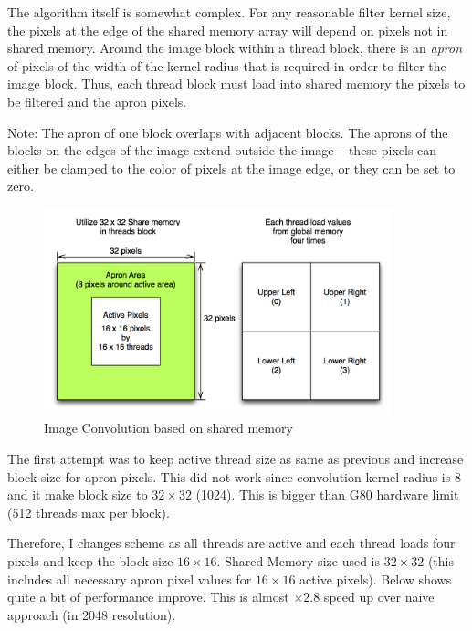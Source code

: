 The algorithm itself is somewhat complex. For any reasonable filter kernel size, the
pixels at the edge of the shared memory array will depend on pixels not in shared memory.
Around the image block within a thread block, there is an \textit{apron} of pixels of the width of the
kernel radius that is required in order to filter the image block. Thus, each thread block
must load into shared memory the pixels to be filtered and the apron pixels.

Note: The apron of one block overlaps with adjacent blocks. The aprons of the
blocks on the edges of the image extend outside the image – these pixels can either be
clamped to the color of pixels at the image edge, or they can be set to zero.

\begin{figure}[!hbtp]
\centering
\includegraphics[width=0.9\textwidth]{CUDAImageProcessing/ImageConvoOnShare1}
\caption{Image Convolution based on shared memory}
\label{fig3.2}
\end{figure}

The first attempt was to keep active thread size as same as previous and increase block size for apron pixels. This did not work since convolution kernel radius is 8 and it make block size to $32 \times 32$ (1024). This is bigger than G80 hardware limit (512 threads max per block).

Therefore, I changes scheme as all threads are active and each thread loads four pixels and keep the block size $16 \times 16$. Shared Memory size used is $32 \times 32$ (this includes all necessary apron pixel values for $16 \times 16$ active pixels). Below shows quite a bit of performance improve. This is almost $\times2.8$ speed up over naive approach (in 2048 resolution).



